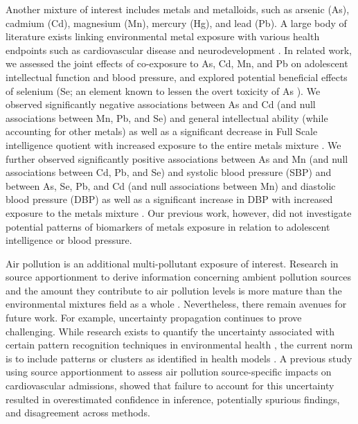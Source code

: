 Another mixture of interest includes metals and metalloids, such as arsenic (As), cadmium (Cd), magnesium (Mn), mercury (Hg), and lead (Pb). A large body of literature exists linking environmental metal exposure with various health endpoints such as cardiovascular disease \cite{nigra2016environmental} and neurodevelopment \cite{henn2012associations}. In related work, we assessed the joint effects of co-exposure to As, Cd, Mn, and Pb on adolescent intellectual function and blood pressure, and explored potential beneficial effects of selenium (Se; an element known to lessen the overt toxicity of As \cite{levander1977metabolic}). We observed significantly negative associations between As and Cd (and null associations between Mn, Pb, and Se) and general intellectual ability (while accounting for other metals) as well as a significant decrease in Full Scale intelligence quotient with increased exposure to the entire metals mixture \cite{wasserman2018cross}. We further observed significantly positive associations between As and Mn (and null associations between Cd, Pb, and Se) and systolic blood pressure (SBP) and between As, Se, Pb, and Cd (and null associations between Mn) and diastolic blood pressure (DBP) as well as a significant increase in DBP with increased exposure to the metals mixture \cite{chen2019early}. Our previous work, however, did not investigate potential patterns of biomarkers of metals exposure in relation to adolescent intelligence or blood pressure.

Air pollution is an additional multi-pollutant exposure of interest. Research in source apportionment to derive information concerning ambient pollution sources and the amount they contribute to air pollution levels is more mature than the environmental mixtures field as a whole \cite{paatero94, sun2020positive, krall2017associations}. Nevertheless, there remain avenues for future work. For example, uncertainty propagation continues to prove challenging. While research exists to quantify the uncertainty associated with certain pattern recognition techniques in environmental health \cite{park2015part, gass2015ensemble}, the current norm is to include patterns or clusters as identified in health models \cite{austin2012framework, zanobetti2014health, sarnat2008fine, krall2017associations, basagana2016neurodevelopmental, siponen2015source, dai2016fine}. A previous study using source apportionment to assess air pollution source-specific impacts on cardiovascular admissions, \citet{mak14_unc} showed that failure to account for this uncertainty resulted in overestimated confidence in inference, potentially spurious findings, and disagreement across methods.

